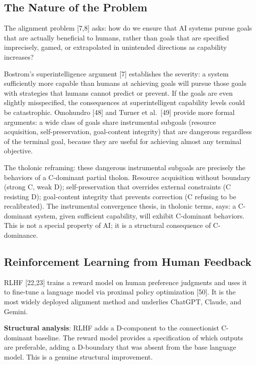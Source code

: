 \documentclass[12pt]{article}
\begin{document}
\subsection{The Nature of the Problem}\label{the-nature-of-the-problem}

The alignment problem {[}7,8{]} asks: how do we ensure that AI systems
pursue goals that are actually beneficial to humans, rather than goals
that are specified imprecisely, gamed, or extrapolated in unintended
directions as capability increases?

Bostrom's superintelligence argument {[}7{]} establishes the severity: a
system sufficiently more capable than humans at achieving goals will
pursue those goals with strategies that humans cannot predict or
prevent. If the goals are even slightly misspecified, the consequences
at superintelligent capability levels could be catastrophic. Omohundro
{[}48{]} and Turner et al.~{[}49{]} provide more formal arguments: a
wide class of goals share instrumental subgoals (resource acquisition,
self-preservation, goal-content integrity) that are dangerous regardless
of the terminal goal, because they are useful for achieving almost any
terminal objective.

The tholonic reframing: these dangerous instrumental subgoals are
precisely the behaviors of a C-dominant partial tholon. Resource
acquisition without boundary (strong C, weak D); self-preservation that
overrides external constraints (C resisting D); goal-content integrity
that prevents correction (C refusing to be recalibrated). The
instrumental convergence thesis, in tholonic terms, says: a C-dominant
system, given sufficient capability, will exhibit C-dominant behaviors.
This is not a special property of AI; it is a structural consequence of
C-dominance.

\subsection{Reinforcement Learning from Human Feedback}\label{reinforcement-learning-from-human-feedback}

RLHF {[}22,23{]} trains a reward model on human preference judgments and
uses it to fine-tune a language model via proximal policy optimization
{[}50{]}. It is the most widely deployed alignment method and underlies
ChatGPT, Claude, and Gemini.

\textbf{Structural analysis}: RLHF adds a D-component to the
connectionist C-dominant baseline. The reward model provides a
specification of which outputs are preferable, adding a D-boundary that
was absent from the base language model. This is a genuine structural
improvement.
\end{document}
